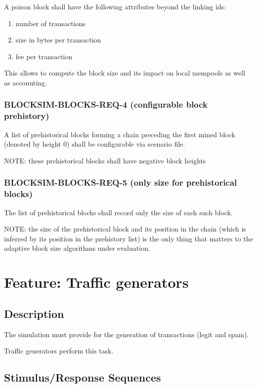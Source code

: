 \documentclass{scrreprt}
\begin{document}
A poison block shall have the following attributes beyond the linking ids:

\begin{enumerate}
   \item number of transactions
   \item size in bytes per transaction
   \item fee per transaction
\end{enumerate}

This allows to compute the block size and its impact on local mempools
as well as accounting.

\subsubsection{BLOCKSIM-BLOCKS-REQ-4 (configurable block prehistory)}

A list of prehistorical blocks forming a chain preceding the first mined
block (denoted by height 0) shall be configurable via scenario file.

NOTE: these prehistorical blocks shall have negative block heights

\subsubsection{BLOCKSIM-BLOCKS-REQ-5 (only size for prehistorical blocks)}

The list of prehistorical blocks shall record only the size of each such
block.

NOTE: the size of the prehistorical block and its position in the chain
(which is inferred by its position in the prehistory list) is the only thing
that matters to the adaptive block size algorithms under evaluation.


\section{Feature: Traffic generators}

\subsection{Description}

The simulation must provide for the generation of transactions (legit and spam).

Traffic generators perform this task.


\subsection{Stimulus/Response Sequences}
\end{document}
